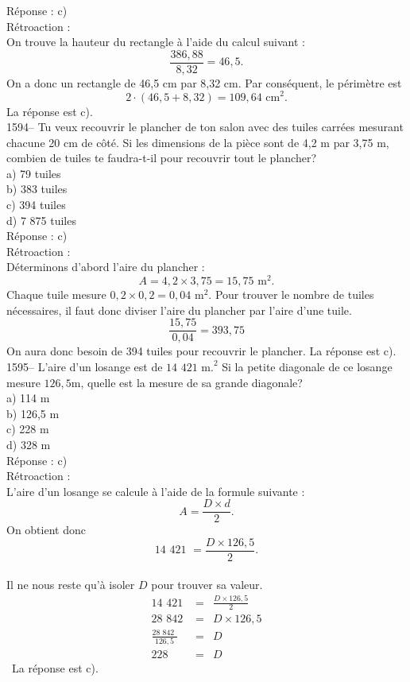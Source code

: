 R\'eponse : c)\\

R\'etroaction :\\
On trouve la hauteur du rectangle \`a l'aide du calcul suivant :
$$\frac{386,88}{8,32}=46,5.$$ On a donc un rectangle de 46,5 cm par
8,32 cm. Par cons\'equent, le p\'erim\`etre est
$$2\cdot(46,5+8,32)=109,64
{\textrm{ cm}}^2.$$ La r\'eponse est c).\\

1594-- Tu veux recouvrir le plancher de ton salon avec des tuiles
carr\'ees mesurant chacune 20 cm de c\^ot\'e. Si les dimensions de
la pi\`ece sont de 4,2 m par 3,75 m, combien de tuiles te
faudra-t-il
pour recouvrir tout le plancher?\\
a) 79 tuiles\\
b) 383 tuiles\\
c) 394 tuiles\\
d) 7 875 tuiles\\

R\'eponse : c)\\

R\'etroaction :\\
D\'eterminons d'abord l'aire du plancher : $$A=4,2\times
3,75=15,75{\textrm{ m}}^2.$$ Chaque tuile mesure $0,2\times
0,2=0,04{\textrm{ m}}^2.$ Pour trouver le nombre de tuiles
n\'ecessaires, il faut donc diviser l'aire du plancher par l'aire
d'une tuile. $$\frac{15,75}{0,04}=393,75$$
On aura donc besoin de 394 tuiles pour recouvrir le plancher. La r\'eponse
est c).\\

1595-- L'aire d'un losange est de ${\textrm{14 421 m.}}^2$ Si la
petite diagonale de ce losange mesure $126,5{\textrm{
m}}$, quelle est la mesure de sa grande diagonale?\\
a) 114 m\\
b) 126,5 m \\
c) 228 m\\
d) 328 m\\

R\'eponse : c)\\

R\'etroaction :\\
L'aire d'un losange se calcule \`a l'aide de la formule suivante :
$$A=\frac{D\times d}{2}.$$
On obtient donc $${\textrm{14 421 }}=\frac{D\times 126,5}{2}.$$\\[3mm]
Il ne nous reste qu'\`a isoler $D$ pour trouver sa valeur.
\begin{eqnarray*}
{\textrm{14 421 }}&=&\frac{{D\times 126,5}}{2}\\[3mm]
{\textrm{28 842 }}&=&D\times 126,5 \\[3mm]
\frac{\textrm{28 842 }}{126,5}&=&D\\[3mm]
228&=&D \end{eqnarray*}\
La r\'eponse est c).\\

